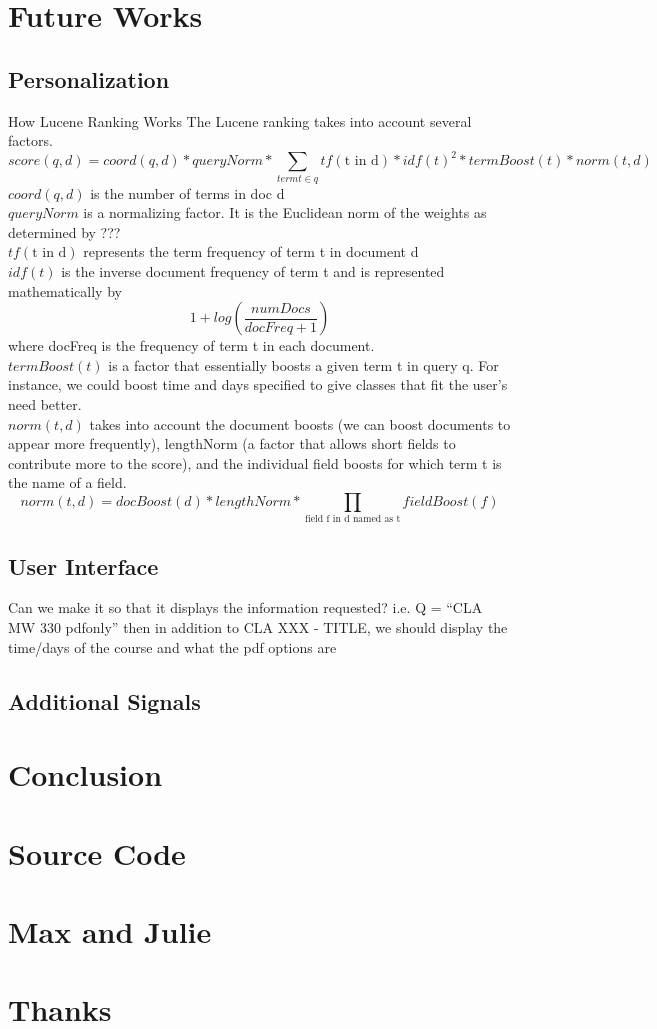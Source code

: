 \documentclass[12pt,letterpaper]{article}
\begin{document}
\section{Future Works}
\subsection{Personalization}
How Lucene Ranking Works
The Lucene ranking takes into account several factors. 
\begin{equation}
  score(q,d) = coord(q,d) * queryNorm * \sum_{term t \in q}{tf(\text{t in d}) * idf(t)^2 * termBoost(t) * norm(t,d)}
  \label{eq:practical}
\end{equation}
$coord(q,d)$ is the number of terms in doc d\\
$queryNorm$ is a normalizing factor. It is the Euclidean norm of the weights as determined by ???\\
$tf(\text{t in d})$ represents the term frequency of term t in document d \\
$idf(t)$ is the inverse document frequency of term t and is represented mathematically by \[ 1 + log(\frac{numDocs}{docFreq + 1}) \] where docFreq is the frequency of term t in each document. \\
$termBoost(t)$ is a factor that essentially boosts a given term t in query q. For instance, we could boost time and days specified to give classes that fit the user's need better.\\
$norm(t, d)$ takes into account the document boosts (we can boost documents to appear more frequently), lengthNorm (a factor that allows short fields to contribute more to the score), and the individual field boosts for which term t is the name of a field. 
\[ norm(t,d) = docBoost(d) * lengthNorm * \prod_{\text{field f in d named as t}}{fieldBoost(f)} \] 				
	
	
\subsection{User Interface}
Can we make it so that it displays the information requested? i.e. Q = ``CLA MW 330 pdfonly'' then in addition to CLA XXX - TITLE, we should display the time/days of the course and what the pdf options are
\subsection{Additional Signals}

\section{Conclusion}

\appendix

\section{Source Code}
\section{Max and Julie}
\section{Thanks}
\end{document}
